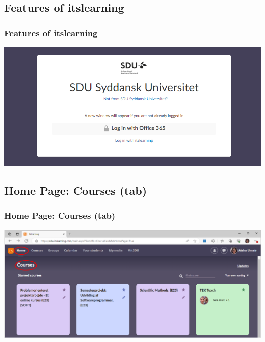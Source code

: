\documentclass[t, aspectratio=169]{beamer}
\begin{document}
\subsection{Features of itslearning}
\begin{frame}[fragile]
  \frametitle{Features of itslearning}
  \vspace{1mm}
  \begin{center}
    \includegraphics[width=14cm]{figs/itslearning/login.png}
  \end{center}
\end{frame}

\subsection{Home Page: Courses (tab)}
\begin{frame}[fragile]
  \frametitle{Home Page: Courses (tab)}
  \vspace{9mm}
  \begin{center}
    \includegraphics[width=14cm]{figs/itslearning/courses.png}
  \end{center}
\end{frame}
\end{document}
